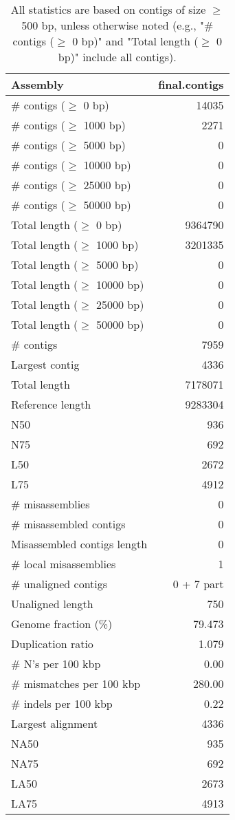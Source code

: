 \documentclass[12pt,a4paper]{article}
\begin{document}
\begin{table}[ht]
\begin{center}
\caption{All statistics are based on contigs of size $\geq$ 500 bp, unless otherwise noted (e.g., "\# contigs ($\geq$ 0 bp)" and "Total length ($\geq$ 0 bp)" include all contigs).}
\begin{tabular}{|l*{1}{|r}|}
\hline
Assembly & final.contigs \\ \hline
\# contigs ($\geq$ 0 bp) & 14035 \\ \hline
\# contigs ($\geq$ 1000 bp) & 2271 \\ \hline
\# contigs ($\geq$ 5000 bp) & 0 \\ \hline
\# contigs ($\geq$ 10000 bp) & 0 \\ \hline
\# contigs ($\geq$ 25000 bp) & 0 \\ \hline
\# contigs ($\geq$ 50000 bp) & 0 \\ \hline
Total length ($\geq$ 0 bp) & 9364790 \\ \hline
Total length ($\geq$ 1000 bp) & 3201335 \\ \hline
Total length ($\geq$ 5000 bp) & 0 \\ \hline
Total length ($\geq$ 10000 bp) & 0 \\ \hline
Total length ($\geq$ 25000 bp) & 0 \\ \hline
Total length ($\geq$ 50000 bp) & 0 \\ \hline
\# contigs & 7959 \\ \hline
Largest contig & 4336 \\ \hline
Total length & 7178071 \\ \hline
Reference length & 9283304 \\ \hline
N50 & 936 \\ \hline
N75 & 692 \\ \hline
L50 & 2672 \\ \hline
L75 & 4912 \\ \hline
\# misassemblies & 0 \\ \hline
\# misassembled contigs & 0 \\ \hline
Misassembled contigs length & 0 \\ \hline
\# local misassemblies & 1 \\ \hline
\# unaligned contigs & 0 + 7 part \\ \hline
Unaligned length & 750 \\ \hline
Genome fraction (\%) & 79.473 \\ \hline
Duplication ratio & 1.079 \\ \hline
\# N's per 100 kbp & 0.00 \\ \hline
\# mismatches per 100 kbp & 280.00 \\ \hline
\# indels per 100 kbp & 0.22 \\ \hline
Largest alignment & 4336 \\ \hline
NA50 & 935 \\ \hline
NA75 & 692 \\ \hline
LA50 & 2673 \\ \hline
LA75 & 4913 \\ \hline
\end{tabular}
\end{center}
\end{table}
\end{document}

